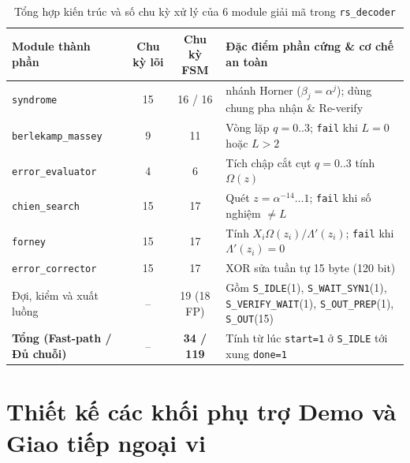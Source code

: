 \documentclass[11pt,a4paper]{report}
\begin{document}
\begin{table}[!htb]
    \centering
    \caption{Tổng hợp kiến trúc và số chu kỳ xử lý của 6 module giải mã trong \texttt{rs\_decoder}}
    \label{tab:decoder-submodules}
    \scriptsize
    \setlength{\tabcolsep}{4pt}
    \renewcommand{\arraystretch}{1.04}
    \begin{tabularx}{\textwidth}{l c c >{\raggedright\arraybackslash}X}
        \toprule
        \textbf{Module thành phần} & \textbf{Chu kỳ lõi} & \textbf{Chu kỳ FSM} & \textbf{Đặc điểm phần cứng \& cơ chế an toàn} \\
        \midrule
        \texttt{syndrome} & 15 & 16 / 16 & 4 nhánh Horner ($\beta_j=\alpha^j$); dùng chung pha nhận \& Re-verify \\
        \texttt{berlekamp\_massey} & 9 & 11 & Vòng lặp $q=0..3$; \texttt{fail} khi $L=0$ hoặc $L>2$ \\
        \texttt{error\_evaluator} & 4 & 6 & Tích chập cắt cụt $q=0..3$ tính $\Omega(z)$ \\
        \texttt{chien\_search} & 15 & 17 & Quét $z=\alpha^{-14}\dots 1$; \texttt{fail} khi số nghiệm $\neq L$ \\
        \texttt{forney} & 15 & 17 & Tính $X_i \Omega(z_i)/\Lambda'(z_i)$; \texttt{fail} khi $\Lambda'(z_i)=0$ \\
        \texttt{error\_corrector} & 15 & 17 & XOR sửa tuần tự 15 byte (120 bit) \\
        Đợi, kiểm và xuất luồng & -- & 19 (18 FP) & Gồm \texttt{S\_IDLE}(1), \texttt{S\_WAIT\_SYN1}(1), \texttt{S\_VERIFY\_WAIT}(1), \texttt{S\_OUT\_PREP}(1), \texttt{S\_OUT}(15) \\
        \midrule
        \textbf{Tổng (Fast-path / Đủ chuỗi)} & -- & \textbf{34 / 119} & Tính từ lúc \texttt{start=1} ở \texttt{S\_IDLE} tới xung \texttt{done=1} \\
        \bottomrule
    \end{tabularx}
\end{table}

\section{Thiết kế các khối phụ trợ Demo và Giao tiếp ngoại vi}
\label{sec:demo-board}
\end{document}
